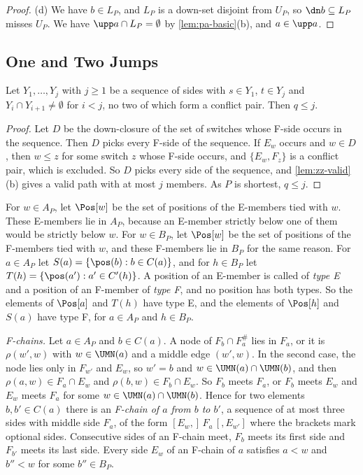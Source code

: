 \begin{proof}
(d) We have $b \in L_P$, and $L_P$ is a down-set disjoint from $U_P$, so $\dn b \subseteq L_P$ misses $U_P$.
We have $\upp a \cap L_P = \emptyset$ by \cref{lem:pa-basic}(b), and $a \in \upp a$.
\end{proof}

\subsection{One and Two Jumps}
\label{sec:pa-jumps}

\begin{lemma}[Walks]
\label{lem:pa-walks}
Let $Y_1, \dots, Y_j$ with $j \geq 1$ be a sequence of sides with $s \in Y_1$, $t \in Y_j$ and $Y_i \cap Y_{i+1} \neq \emptyset$ for $i < j$, no two of which form a conflict pair.
Then $q \leq j$.
\end{lemma}

\begin{proof}
Let $D$ be the down-closure of the set of switches whose F-side occurs in the sequence.
Then $D$ picks every F-side of the sequence.
If $E_w$ occurs and $w \in D$, then $w \leq z$ for some switch $z$ whose F-side occurs, and $\{E_w, F_z\}$ is a conflict pair, which is excluded.
So $D$ picks every side of the sequence, and \cref{lem:zz-valid}(b) gives a valid path with at most $j$ members.
As $P$ is shortest, $q \leq j$.
\end{proof}

For $w \in A_P$, let $\Pos[w]$ be the set of positions of the E-members tied with $w$.
These E-members lie in $A_P$, because an E-member strictly below one of them would be strictly below $w$.
For $w \in B_P$, let $\Pos[w]$ be the set of positions of the F-members tied with $w$, and these F-members lie in $B_P$ for the same reason.
For $a \in A_P$ let $S(a) = \{\pos(b) : b \in C(a)\}$, and for $h \in B_P$ let $T(h) = \{\pos(a') : a' \in C'(h)\}$.
A position of an E-member is called of \emph{type E} and a position of an F-member of \emph{type F}, and no position has both types.
So the elements of $\Pos[a]$ and $T(h)$ have type E, and the elements of $\Pos[h]$ and $S(a)$ have type F, for $a \in A_P$ and $h \in B_P$.

\emph{F-chains.}
Let $a \in A_P$ and $b \in C(a)$.
A node of $F_b \cap F^\#_a$ lies in $F_a$, or it is $\rho(w', w)$ with $w \in \UMN(a)$ and a middle edge $(w', w)$.
In the second case, the node lies only in $F_{w'}$ and $E_w$, so $w' = b$ and $w \in \UMN(a) \cap \UMN(b)$, and then $\rho(a, w) \in F_a \cap E_w$ and $\rho(b, w) \in F_b \cap E_w$.
So $F_b$ meets $F_a$, or $F_b$ meets $E_w$ and $E_w$ meets $F_a$ for some $w \in \UMN(a) \cap \UMN(b)$.
Hence for two elements $b, b' \in C(a)$ there is an \emph{F-chain of $a$ from $b$ to $b'$}, a sequence of at most three sides with middle side $F_a$, of the form $[E_w,]\, F_a\, [, E_{w'}]$ where the brackets mark optional sides.
Consecutive sides of an F-chain meet, $F_b$ meets its first side and $F_{b'}$ meets its last side.
Every side $E_w$ of an F-chain of $a$ satisfies $a < w$ and $b'' < w$ for some $b'' \in B_P$.

